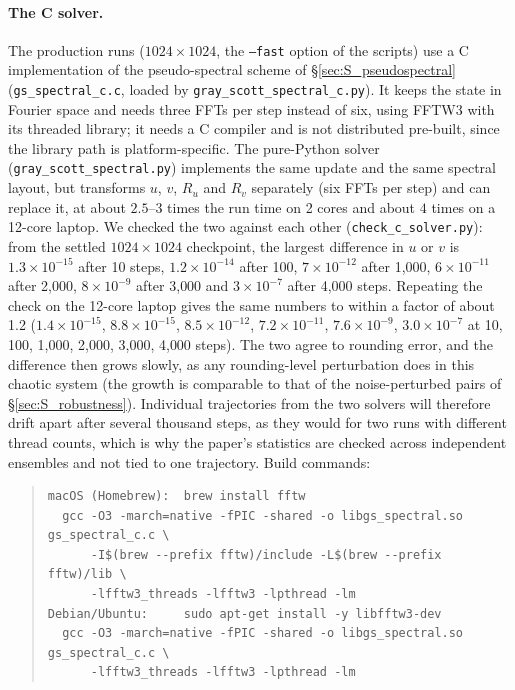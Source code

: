 \documentclass[11pt]{article}
\begin{document}
\paragraph{The C solver.} The production runs ($1024\times1024$, the \texttt{--fast} option of the scripts) use a C implementation of the pseudo-spectral scheme of \S\ref{sec:S_pseudospectral} (\texttt{gs\_spectral\_c.c}, loaded by \texttt{gray\_scott\_spectral\_c.py}). It keeps the state in Fourier space and needs three FFTs per step instead of six, using FFTW3 with its threaded library; it needs a C compiler and is not distributed pre-built, since the library path is platform-specific. The pure-Python solver (\texttt{gray\_scott\_spectral.py}) implements the same update and the same spectral layout, but transforms $u$, $v$, $R_u$ and $R_v$ separately (six FFTs per step) and can replace it, at about $2.5$--$3$ times the run time on 2 cores and about $4$ times on a 12-core laptop. We checked the two against each other (\texttt{check\_c\_solver.py}): from the settled $1024\times1024$ checkpoint, the largest difference in $u$ or $v$ is $1.3\times10^{-15}$ after 10 steps, $1.2\times10^{-14}$ after 100, $7\times10^{-12}$ after 1{,}000, $6\times10^{-11}$ after 2{,}000, $8\times10^{-9}$ after 3{,}000 and $3\times10^{-7}$ after 4{,}000 steps. Repeating the check on the 12-core laptop gives the same numbers to within a factor of about 1.2 ($1.4\times10^{-15}$, $8.8\times10^{-15}$, $8.5\times10^{-12}$, $7.2\times10^{-11}$, $7.6\times10^{-9}$, $3.0\times10^{-7}$ at 10, 100, 1{,}000, 2{,}000, 3{,}000, 4{,}000 steps). The two agree to rounding error, and the difference then grows slowly, as any rounding-level perturbation does in this chaotic system (the growth is comparable to that of the noise-perturbed pairs of \S\ref{sec:S_robustness}). Individual trajectories from the two solvers will therefore drift apart after several thousand steps, as they would for two runs with different thread counts, which is why the paper's statistics are checked across independent ensembles and not tied to one trajectory. Build commands:
\begin{quote}\footnotesize
\begin{verbatim}
macOS (Homebrew):  brew install fftw
  gcc -O3 -march=native -fPIC -shared -o libgs_spectral.so gs_spectral_c.c \
      -I$(brew --prefix fftw)/include -L$(brew --prefix fftw)/lib \
      -lfftw3_threads -lfftw3 -lpthread -lm
Debian/Ubuntu:     sudo apt-get install -y libfftw3-dev
  gcc -O3 -march=native -fPIC -shared -o libgs_spectral.so gs_spectral_c.c \
      -lfftw3_threads -lfftw3 -lpthread -lm
\end{verbatim}
\end{quote}
\end{document}
